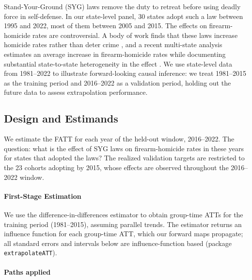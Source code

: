 \documentclass{article}
\begin{document}
Stand-Your-Ground (SYG) laws remove the duty to retreat before using deadly force in self-defense. In our state-level panel, 30 states adopt such a law between 1995 and 2022, most of them between 2005 and 2015. The effects on firearm-homicide rates are controversial. A body of work finds that these laws increase homicide rates rather than deter crime \citep{chengHoekstraCastleDoctrine2013, mcclellanTekinStandYourGround2017, humphreysFloridaStandYourGround2017}, and a recent multi-state analysis estimates an average increase in firearm-homicide rates while documenting substantial state-to-state heterogeneity in the effect \citep{degliEspostiStandYourGround2022, siegelStandYourGroundHeterogeneity2022}. We use state-level data from 1981--2022 to illustrate forward-looking causal inference: we treat 1981--2015 as the training period and 2016--2022 as a validation period, holding out the future data to assess extrapolation performance.

\subsection{Design and Estimands}


We estimate the FATT for each year of the held-out window, 2016--2022. The question: what is the effect of SYG laws on firearm-homicide rates in these years for states that adopted the laws? The realized validation targets are restricted to the 23 cohorts adopting by 2015, whose effects are observed throughout the 2016--2022 window.

\paragraph{First-Stage Estimation}

We use the \citet{callawayDifferenceindifferencesMultipleTime2021} difference-in-differences estimator to obtain group-time ATTs for the training period (1981--2015), assuming parallel trends. The estimator returns an influence function for each group-time ATT, which our forward maps propagate; all standard errors and intervals below are influence-function based (package \texttt{extrapolateATT}).

\paragraph{Paths applied}
\end{document}
